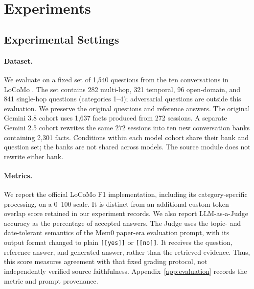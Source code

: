 \documentclass[11pt]{article}
\begin{document}
\section{Experiments}
\subsection{Experimental Settings}
\paragraph{Dataset.}
We evaluate on a fixed set of 1,540 questions from the ten conversations in LoCoMo \citep{maharana-etal-2024-evaluating}. The set contains 282 multi-hop, 321 temporal, 96 open-domain, and 841 single-hop questions (categories 1--4); adversarial questions are outside this evaluation. We preserve the original questions and reference answers. The original Gemini 3.8 cohort uses 1,637 facts produced from 272 sessions. A separate Gemini 2.5 cohort rewrites the same 272 sessions into ten new conversation banks containing 2,301 facts. Conditions within each model cohort share their bank and question set; the banks are not shared across models. The source module does not rewrite either bank.

\paragraph{Metrics.}
We report the official LoCoMo F1 implementation, including its category-specific processing, on a 0--100 scale. It is distinct from an additional custom token-overlap score retained in our experiment records. We also report LLM-as-a-Judge accuracy as the percentage of accepted answers. The Judge uses the topic- and date-tolerant semantics of the Mem0 paper-era evaluation prompt, with its output format changed to plain \texttt{[[yes]]} or \texttt{[[no]]}. It receives the question, reference answer, and generated answer, rather than the retrieved evidence. Thus, this score measures agreement with that fixed grading protocol, not independently verified source faithfulness. Appendix~\ref{app:evaluation} records the metric and prompt provenance.
\end{document}

